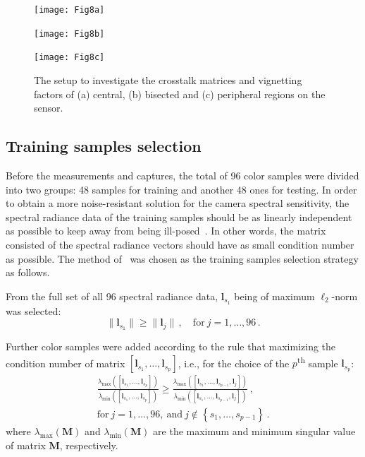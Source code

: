 \documentclass[9pt,twocolumn,twoside]{osajnl}
\begin{document}
\begin{figure}[tbp]
	\centering
	\begin{minipage}{0.32\linewidth}
		\centering
		\texttt{[image: Fig8a]}
	\end{minipage}%
	\hfill
	\begin{minipage}{0.32\linewidth}
		\centering
		\texttt{[image: Fig8b]}
	\end{minipage}%
	\hfill
	\begin{minipage}{0.32\linewidth}
		\centering
		\texttt{[image: Fig8c]}
	\end{minipage}
	\caption{The setup to investigate the crosstalk matrices and vignetting factors of (a) central, (b) bisected and (c) peripheral regions on the sensor.}
	\label{fig:8}
\end{figure}

\subsection{Training samples selection}\label{sec:training samples selection}

Before the measurements and captures, the total of 96 color samples were divided into two groups: 48 samples for training and another 48 ones for testing. In order to obtain a more noise-resistant solution for the camera spectral sensitivity, the spectral radiance data of the training samples should be as linearly independent as possible to keep away from being ill-posed~\cite{Hansen:93}. In other words, the matrix consisted of the spectral radiance vectors should have as small condition number as possible. The method of~\cite{Hardeberg:98} was chosen as the training samples selection strategy as follows.

From the full set of all 96 spectral radiance data, $\mathbf{l}_{s_1}$ being of maximum $\ell_2$-norm was selected:
\begin{equation}
\big\|\mathbf{l}_{s_1}\big\|\ge\big\|\mathbf{l}_j\big\|\,,\quad\text{for}\ j = 1,\ldots,96\,.
\label{eq:27}
\end{equation}

Further color samples were added according to the rule that maximizing the condition number of matrix $\left[\mathbf{l}_{s_1},\ldots,\mathbf{l}_{s_p}\right]$, i.e., for the choice of the $p$\textsuperscript{th} sample $\mathbf{l}_{s_p}$:
\begin{equation}
\begin{split}
\frac{\lambda_\text{max}\left(\left[\mathbf{l}_{s_1},\ldots,\mathbf{l}_{s_p}\right]\right)}{\lambda_\text{min}\left(\left[\mathbf{l}_{s_1},\ldots,\mathbf{l}_{s_p}\right]\right)} \ge%
\frac{\lambda_\text{max}\left(\left[\mathbf{l}_{s_1},\ldots,\mathbf{l}_{s_{p-1}},\mathbf{l}_j\right]\right)}{\lambda_\text{min}\left(\left[\mathbf{l}_{s_1},\ldots,\mathbf{l}_{s_{p-1}},\mathbf{l}_j\right]\right)}\,,\\[4pt]
\text{for}\ j = 1,\ldots,96,\ \text{and}\ j\notin\left\{s_1,\ldots,s_{p-1}\right\}\,.
\end{split}
\label{eq:28}
\end{equation}
where $\lambda_\text{max}(\mathbf{M})$ and $\lambda_\text{min}(\mathbf{M})$ are the maximum and minimum singular value of matrix $\mathbf{M}$, respectively.
\end{document}

